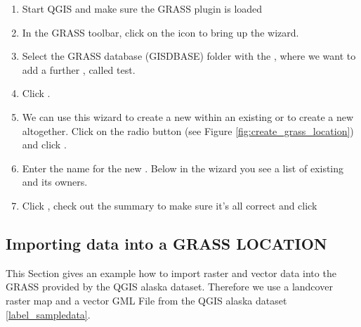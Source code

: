 \begin{enumerate}
  \item Start QGIS and make sure the GRASS plugin is loaded
  \item In the GRASS toolbar, click on the 
   icon to bring up the 
   wizard.
  \item Select the GRASS database (GISDBASE) folder  
  with the , where we want to add a further 
  , called test.
  \item Click . 
  \item We can use this wizard to create a new  within an 
  existing  or to create a new  
  altogether. Click on the radio button  
  (see Figure \ref{fig:create_grass_location}) and click .
  \item Enter the name  for the new . Below 
  in the wizard you see a list of existing  and its owners.
  \item Click , check out the summary to make sure it's all 
  correct and click  
\end{enumerate}

\subsection{Importing data into a GRASS LOCATION}\label{sec:import_loc_data}

This Section gives an example how to import raster and vector data into the 
 GRASS  provided by the QGIS alaska 
dataset. Therefore we use a landcover raster map  
and a vector GML File  from the QGIS alaska 
dataset \ref{label_sampledata}.


